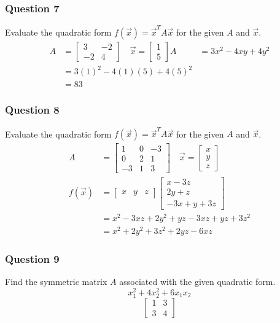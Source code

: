 \documentclass{math}
\begin{document}
\subsubsection*{Question 7}
Evaluate the quadratic form \( f(\vec{x}) = \vec{x}^TA\vec{x} \) for the given
\( A \) and \( \vec{x} \).
\begin{align*}
  A &= \begin{bmatrix}3 & -2 \\ -2 & 4\end{bmatrix} \quad
    \vec{x} = \begin{bmatrix}1 \\ 5\end{bmatrix}
  A &= 3x^2-4xy+4y^2 \\
  &= 3(1)^2-4(1)(5)+4(5)^2 \\
  &= 83
\end{align*}

\subsubsection*{Question 8}
Evaluate the quadratic form \( f(\vec{x}) = \vec{x}^TA\vec{x} \) for the given
\( A \) and \( \vec{x} \).
\begin{align*}
  A &= \begin{bmatrix}
    1 & 0 & -3 \\
    0 & 2 & 1 \\
    -3 & 1 & 3
  \end{bmatrix} \quad \vec{x} = \begin{bmatrix}x \\ y \\ z\end{bmatrix} \\
  f(\vec{x}) &= \begin{bmatrix}x & y & z\end{bmatrix}\begin{bmatrix}
    x-3z \\ 2y+z \\ -3x+y+3z
  \end{bmatrix} \\
  &= x^2-3xz+2y^2+yz-3xz+yz+3z^2 \\
  &= x^2+2y^2+3z^2+2yz-6xz
\end{align*}

\subsubsection*{Question 9}
Find the symmetric matrix \( A \) associated with the given quadratic form.
\[ x_1^2+4x_2^2+6x_1x_2 \]
\[ \begin{bmatrix}1 & 3 \\ 3 & 4\end{bmatrix} \]
\end{document}
